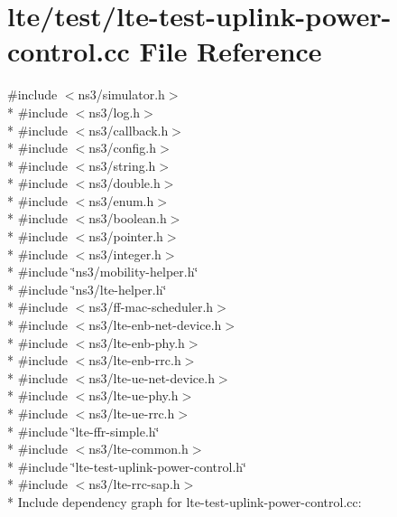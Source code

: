 \hypertarget{lte-test-uplink-power-control_8cc}{}\section{lte/test/lte-\/test-\/uplink-\/power-\/control.cc File Reference}
\label{lte-test-uplink-power-control_8cc}
{\ttfamily \#include $<$ns3/simulator.\+h$>$}\\*
{\ttfamily \#include $<$ns3/log.\+h$>$}\\*
{\ttfamily \#include $<$ns3/callback.\+h$>$}\\*
{\ttfamily \#include $<$ns3/config.\+h$>$}\\*
{\ttfamily \#include $<$ns3/string.\+h$>$}\\*
{\ttfamily \#include $<$ns3/double.\+h$>$}\\*
{\ttfamily \#include $<$ns3/enum.\+h$>$}\\*
{\ttfamily \#include $<$ns3/boolean.\+h$>$}\\*
{\ttfamily \#include $<$ns3/pointer.\+h$>$}\\*
{\ttfamily \#include $<$ns3/integer.\+h$>$}\\*
{\ttfamily \#include \char`\"{}ns3/mobility-\/helper.\+h\char`\"{}}\\*
{\ttfamily \#include \char`\"{}ns3/lte-\/helper.\+h\char`\"{}}\\*
{\ttfamily \#include $<$ns3/ff-\/mac-\/scheduler.\+h$>$}\\*
{\ttfamily \#include $<$ns3/lte-\/enb-\/net-\/device.\+h$>$}\\*
{\ttfamily \#include $<$ns3/lte-\/enb-\/phy.\+h$>$}\\*
{\ttfamily \#include $<$ns3/lte-\/enb-\/rrc.\+h$>$}\\*
{\ttfamily \#include $<$ns3/lte-\/ue-\/net-\/device.\+h$>$}\\*
{\ttfamily \#include $<$ns3/lte-\/ue-\/phy.\+h$>$}\\*
{\ttfamily \#include $<$ns3/lte-\/ue-\/rrc.\+h$>$}\\*
{\ttfamily \#include \char`\"{}lte-\/ffr-\/simple.\+h\char`\"{}}\\*
{\ttfamily \#include $<$ns3/lte-\/common.\+h$>$}\\*
{\ttfamily \#include \char`\"{}lte-\/test-\/uplink-\/power-\/control.\+h\char`\"{}}\\*
{\ttfamily \#include $<$ns3/lte-\/rrc-\/sap.\+h$>$}\\*
Include dependency graph for lte-\/test-\/uplink-\/power-\/control.cc\+:
